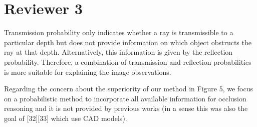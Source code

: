 \documentclass[10pt,twocolumn,letterpaper]{article}
\begin{document}
\section{Reviewer 3}

Transmission probability only indicates whether a ray is transmissible to a particular depth but does not provide information on which object obstructs the ray at that depth. Alternatively, this information is given by the reflection probability. Therefore, a combination of transmission and reflection probabilities is more suitable for explaining the image observations.

Regarding the concern about the superiority of our method in Figure 5, we focus on a probabilistic method to incorporate all available information for occlusion reasoning and it is not provided by previous works (in a sense this was also the goal of [32][33] which use CAD models).
\end{document}
